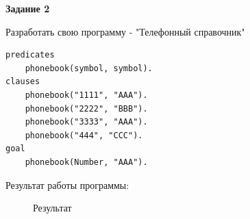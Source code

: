 \documentclass[12pt, a4paper]{extarticle}
\begin{document}
\newpage
\textbf{Задание 2}\par
Разработать свою программу - "Телефонный справочник"\par

\begin{lstlisting}
predicates
	phonebook(symbol, symbol).
clauses
	phonebook("1111", "AAA").
	phonebook("2222", "BBB").
	phonebook("3333", "AAA").
	phonebook("444", "CCC").
goal
	phonebook(Number, "AAA").

\end{lstlisting}

Результат работы программы:
\begin{figure}[h!]
	\caption{Результат}
\end{figure}
\end{document}
